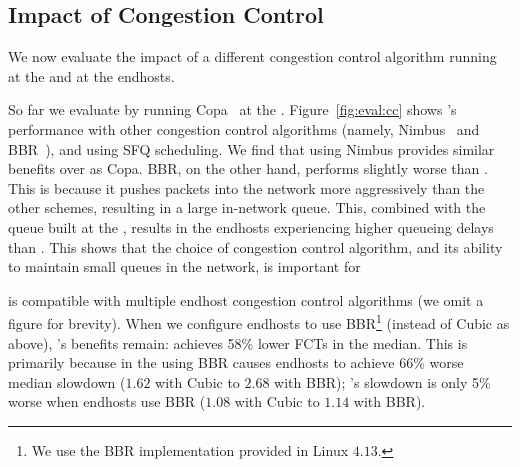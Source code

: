 \subsection{Impact of Congestion Control} \label{s:robust:cross}\label{s:eval:cc}

We now evaluate the impact of a different congestion control algorithm running at the \inbox and at the endhosts.
% 




 So far we evaluate \name by running Copa~\cite{copa} at the \inbox.  Figure~\ref{fig:eval:cc} shows \name's performance with other congestion control algorithms (namely, Nimbus~\cite{nimbus} and BBR~\cite{bbr}), and using SFQ scheduling. We find that using Nimbus provides similar benefits over \baseline as Copa. BBR, on the other hand, performs slightly worse than \baseline. This is because it pushes packets into the network more aggressively than the other schemes, resulting in a large in-network queue. This, combined with the queue built at the \name, results in the endhosts experiencing higher queueing delays than \baseline. This shows that the choice of congestion control algorithm, and its ability to maintain small queues in the network, is important for  

\name is compatible with multiple endhost congestion control algorithms (we omit a figure for brevity).
When we configure endhosts to use BBR\footnote{We use the BBR implementation provided in Linux $4.13$.} (instead of Cubic as above), \name's benefits remain: \name achieves 58\% lower FCTs in the median.
This is primarily because in the \baseline using BBR causes endhosts to achieve 66\% worse median slowdown ($1.62$ with Cubic to $2.68$ with BBR); \name's slowdown is only 5\% worse when endhosts use BBR ($1.08$ with Cubic to $1.14$ with BBR).

